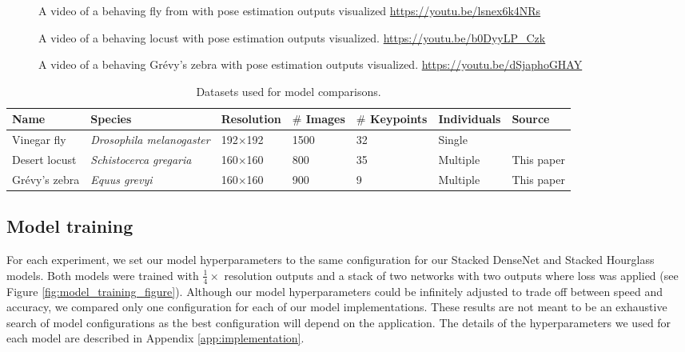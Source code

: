 \documentclass[11pt,a4paper,oneside]{book}
\begin{document}
\begin{doublespace}
\begin{figure}[!htb]
\end{figure}
\begin{figure}[!htb]
    \centering
    \caption{A video of a behaving fly from \cite{pereira2019fast} with pose estimation outputs visualized \url{https://youtu.be/lsnex6k4NRs}}
    \label{videosupp:sv1}
\end{figure}

\begin{figure}[!htb]
    \centering
    \caption{A video of a behaving locust with pose estimation outputs visualized. \url{https://youtu.be/b0DyyLP_Czk}}
    \label{videosupp:sv2}
\end{figure}

\begin{figure}[!htb]
    \centering
    \caption{A video of a behaving Grévy's zebra with pose estimation outputs visualized. \url{https://youtu.be/dSjaphoGHAY}}
    \label{videosupp:sv3}
\end{figure}


\begin{table}[!htb]

\caption{\label{tab:datasets}Datasets used for model comparisons.}
\setlength{\tabcolsep}{2pt}
\centering
\begin{tabular}{|m{}|m{}|m{}|m{}|m{}|m{}|m{}|}
\hline
{Name} & Species   & {Resolution}  & {$\#$ Images}  & {$\#$ Keypoints} & {Individuals} & Source    \\ \hline
Vinegar fly  & \textit{Drosophila melanogaster} & {192$\times$192} & 1500 & 32 & Single & \cite{pereira2019fast} \\ \hline
Desert locust     & \textit{Schistocerca gregaria}       & 160$\times$160           & 800    & 35 & Multiple  & This paper\\ \hline
Grévy's zebra      & \textit{Equus grevyi}      & 160$\times$160              & 900    & 9 & Multiple & This paper \\ \hline
\end{tabular}

\end{table}

\subsection{Model training}
For each experiment, we set our model hyperparameters to the same configuration for our Stacked DenseNet and Stacked Hourglass models. Both models were trained with $\tfrac{1}{4}\times$ resolution outputs and a stack of two networks with two outputs where loss was applied (see Figure \ref{fig:model_training_figure}). Although our model hyperparameters could be infinitely adjusted to trade off between speed and accuracy, we compared only one configuration for each of our model implementations. These results are not meant to be an exhaustive search of model configurations as the best configuration will depend on the application. The details of the hyperparameters we used for each model are described in Appendix \ref{app:implementation}.


\end{doublespace}
\end{document}
